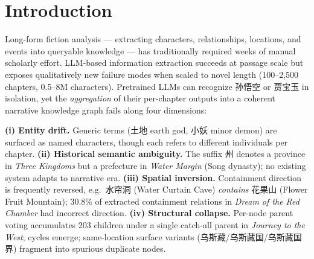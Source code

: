 \documentclass[11pt]{article}
\newenvironment{CJK}[2]{}{}
\begin{document}
\section{Introduction}

Long-form fiction analysis --- extracting characters, relationships, locations, and events into queryable knowledge --- has traditionally required weeks of manual scholarly effort. LLM-based information extraction \cite{wei2024zeroshot,wadhwa2023revisiting} succeeds at passage scale but exposes qualitatively new failure modes when scaled to novel length (100--2{,}500 chapters, 0.5--8M characters). Pretrained LLMs can recognize \begin{CJK}{UTF8}{gbsn}孙悟空\end{CJK} or \begin{CJK}{UTF8}{gbsn}贾宝玉\end{CJK} in isolation, yet the \textit{aggregation} of their per-chapter outputs into a coherent narrative knowledge graph fails along four dimensions:

\textbf{(i) Entity drift.} Generic terms (\begin{CJK}{UTF8}{gbsn}土地\end{CJK} earth god, \begin{CJK}{UTF8}{gbsn}小妖\end{CJK} minor demon) are surfaced as named characters, though each refers to different individuals per chapter.
\textbf{(ii) Historical semantic ambiguity.} The suffix \begin{CJK}{UTF8}{gbsn}州\end{CJK} denotes a province in \textit{Three Kingdoms} but a prefecture in \textit{Water Margin} (Song dynasty); no existing system adapts to narrative era.
\textbf{(iii) Spatial inversion.} Containment direction is frequently reversed, e.g.\ \begin{CJK}{UTF8}{gbsn}水帘洞\end{CJK} (Water Curtain Cave) \textit{contains} \begin{CJK}{UTF8}{gbsn}花果山\end{CJK} (Flower Fruit Mountain); 30.8\% of extracted containment relations in \textit{Dream of the Red Chamber} had incorrect direction.
\textbf{(iv) Structural collapse.} Per-node parent voting accumulates 203 children under a single catch-all parent in \textit{Journey to the West}; cycles emerge; same-location surface variants (\begin{CJK}{UTF8}{gbsn}乌斯藏/乌斯藏国/乌斯藏国界\end{CJK}) fragment into spurious duplicate nodes.
\end{document}
